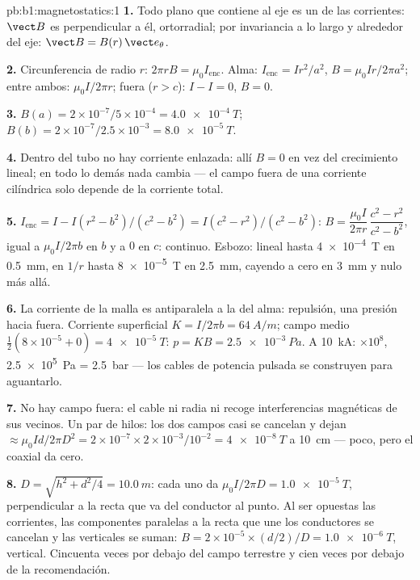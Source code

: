 \begin{solution}{pb:b1:magnetostatics:1}
\textbf{1.} Todo plano que contiene al eje es un  de las
corrientes: $\vect B$ es perpendicular a él, ortorradial; por invariancia
a lo largo y alrededor del eje: $\vect B = B(r)\,\vect e_\theta$.

\textbf{2.} Circunferencia de radio $r$: $2\pi rB = \mu_0I_{\text{enc}}$. Alma:
$I_{\text{enc}} = Ir^2/a^2$, $B = \mu_0Ir/2\pi a^2$; entre ambos: $\mu_0I/2\pi r$;
fuera ($r > c$): $I - I = 0$, $B = 0$.

\textbf{3.} $B(a) = 2 \times 10^{-7}/5 \times 10^{-4} = \qty{4.0e-4}{T}$; $B(b) = 2 \times
10^{-7}/2.5 \times 10^{-3} = \qty{8.0e-5}{T}$.

\textbf{4.} Dentro del tubo no hay corriente enlazada: allí $B = 0$ en vez
del crecimiento lineal; en todo lo demás nada cambia --- el campo fuera de
una corriente cilíndrica solo depende de la corriente total.

\textbf{5.} $I_{\text{enc}} = I - I(r^2 - b^2)/(c^2 - b^2) = I(c^2 - r^2)/(c^2 -
b^2)$: $B = \dfrac{\mu_0I}{2\pi r}\,\dfrac{c^2 - r^2}{c^2 - b^2}$, igual a $\mu_0I/2\pi b$ en
$b$ y a $0$ en $c$: continuo. Esbozo: lineal hasta \qty{4e-4}{T} en
\qty{0.5}{mm}, en $1/r$ hasta \qty{8e-5}{T} en \qty{2.5}{mm}, cayendo a cero en
\qty{3}{mm} y nulo más allá.

\textbf{6.} La corriente de la malla es antiparalela a la del alma: repulsión,
una presión hacia fuera. Corriente superficial $K = I/2\pi b = \qty{64}{A/m}$; campo medio
$\tfrac12(8 \times 10^{-5} + 0) = \qty{4e-5}{T}$: $p = KB = \qty{2.5e-3}{Pa}$. A
\qty{10}{kA}: $\times10^8$, \qty{2.5e5}{Pa} = \qty{2.5}{bar} --- los cables de
potencia pulsada se construyen para aguantarlo.

\textbf{7.} No hay campo fuera: el cable ni radia ni recoge interferencias
magnéticas de sus vecinos. Un par de hilos: los dos campos casi se
cancelan y dejan $\approx \mu_0Id/2\pi D^2 = 2 \times 10^{-7} \times 2 \times
10^{-3}/10^{-2} = \qty{4e-8}{T}$ a \qty{10}{cm} --- poco, pero el coaxial da
cero.

\textbf{8.} $D = \sqrt{h^2 + d^2/4} = \qty{10.0}{m}$: cada uno da $\mu_0I/2\pi D =
\qty{1.0e-5}{T}$, perpendicular a la recta que va del conductor al punto. Al
ser opuestas las corrientes, las componentes paralelas a la recta que une
los conductores se cancelan y las verticales se suman: $B = 2 \times 10^{-5} \times
(d/2)/D = \qty{1.0e-6}{T}$, vertical. Cincuenta veces por debajo del campo terrestre
y cien veces por debajo de la recomendación.


\end{solution}
